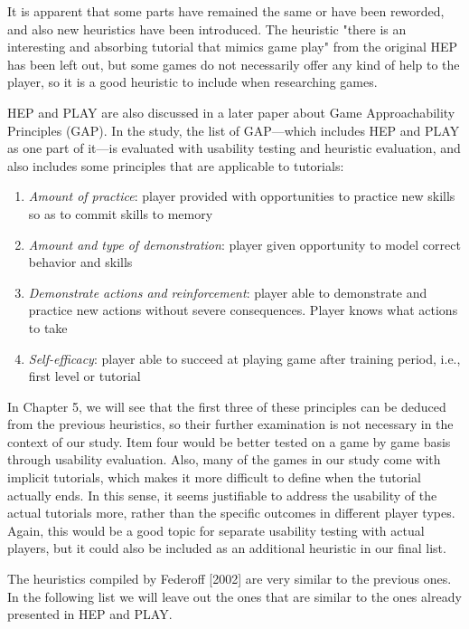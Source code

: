 It is apparent that some parts have remained the same or have been reworded, and also new heuristics have been introduced. The heuristic "there is an interesting and absorbing tutorial that mimics game play" from the original HEP has been left out, but some games do not necessarily offer any kind of help to the player, so it is a good heuristic to include when researching games. 

HEP and PLAY are also discussed in a later paper about Game Approachability Principles (GAP). \cite{Desurvire2015} In the study, the list of GAP---which includes HEP and PLAY as one part of it---is evaluated with usability testing and heuristic evaluation, and also includes some principles that are applicable to tutorials:

\begin{enumerate}
	\item \textit{Amount of practice}: player provided with opportunities to practice new skills so as to commit skills to memory
	\item \textit{Amount and type of demonstration}: player given opportunity to model correct behavior and skills
	\item \textit{Demonstrate actions and reinforcement}: player able to demonstrate and practice new actions without severe consequences. Player knows what actions to take
	\item \textit{Self-efficacy}: player able to succeed at playing game after training period, i.e., first level or tutorial
\end{enumerate}

In Chapter 5, we will see that the first three of these principles can be deduced from the previous heuristics, so their further examination is not necessary in the context of our study. Item four would be better tested on a game by game basis through usability evaluation. Also, many of the games in our study come with implicit tutorials, which makes it more difficult to define when the tutorial actually ends. In this sense, it seems justifiable to address the usability of the actual tutorials more, rather than the specific outcomes in different player types. Again, this would be a good topic for separate usability testing with actual players, but it could also be included as an additional heuristic in our final list. 	

The heuristics compiled by Federoff [2002] are very similar to the previous ones. In the following list we will leave out the ones that are similar to the ones already presented in HEP and PLAY.


